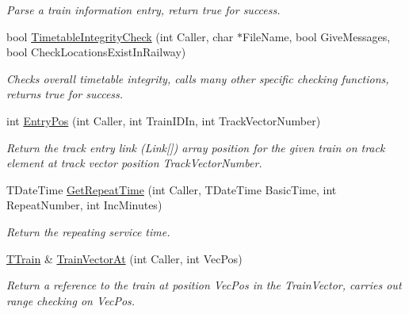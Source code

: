 \begin{DoxyCompactItemize}
\begin{DoxyCompactList}\small\item\em Parse a train information entry, return true for success. \end{DoxyCompactList}\item 
\mbox{\label{class_t_train_controller_ac51af4807fe6bba453f8ab9bba42e2b5}} 
bool \mbox{\hyperlink{class_t_train_controller_ac51af4807fe6bba453f8ab9bba42e2b5}{Timetable\+Integrity\+Check}} (int Caller, char $\ast$File\+Name, bool Give\+Messages, bool Check\+Locations\+Exist\+In\+Railway)
\begin{DoxyCompactList}\small\item\em Checks overall timetable integrity, calls many other specific checking functions, returns true for success. \end{DoxyCompactList}\item 
\mbox{\label{class_t_train_controller_aa60ab73bef848c5458cdf0217092aef8}} 
int \mbox{\hyperlink{class_t_train_controller_aa60ab73bef848c5458cdf0217092aef8}{Entry\+Pos}} (int Caller, int Train\+I\+D\+In, int Track\+Vector\+Number)
\begin{DoxyCompactList}\small\item\em Return the track entry link (Link\mbox{[}\mbox{]}) array position for the given train on track element at track vector position Track\+Vector\+Number. \end{DoxyCompactList}\item 
\mbox{\label{class_t_train_controller_a435ef46f062904e85ae9792faaecdcf7}} 
T\+Date\+Time \mbox{\hyperlink{class_t_train_controller_a435ef46f062904e85ae9792faaecdcf7}{Get\+Repeat\+Time}} (int Caller, T\+Date\+Time Basic\+Time, int Repeat\+Number, int Inc\+Minutes)
\begin{DoxyCompactList}\small\item\em Return the repeating service time. \end{DoxyCompactList}\item 
\mbox{\label{class_t_train_controller_aa09adf9c442406cccc270d6703867a1d}} 
\mbox{\hyperlink{class_t_train}{T\+Train}} \& \mbox{\hyperlink{class_t_train_controller_aa09adf9c442406cccc270d6703867a1d}{Train\+Vector\+At}} (int Caller, int Vec\+Pos)
\begin{DoxyCompactList}\small\item\em Return a reference to the train at position Vec\+Pos in the Train\+Vector, carries out range checking on Vec\+Pos. \end{DoxyCompactList}\item 

\end{DoxyCompactItemize}
